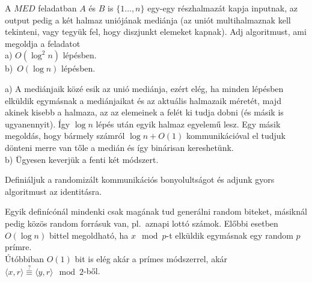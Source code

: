 \begin{Exercise}[counter={sorszam}, difficulty=0]
	A $MED$ feladatban $A$ \'es $B$ is $\{1\ldots,n\}$ egy-egy r\'eszhalmaz\'at kapja inputnak, az output pedig a k\'et halmaz uni\'oj\'anak medi\'anja (az uni\'ot multihalmaznak kell tekinteni, vagy tegy\"uk fel, hogy diszjunkt elemeket kapnak). Adj algoritmust, ami megoldja a feladatot\\
	a) $O(\log^2 n)$ l\'ep\'esben.\\
	b)~\hard $O(\log n)$ l\'ep\'esben.
\end{Exercise}
\begin{Answer}
	a) A medi\'anjaik k\"oz\'e esik az uni\'o medi\'anja, ez\'ert el\'eg, ha minden l\'ep\'esben elk\"uldik egym\'asnak a medi\'anjaikat \'es az aktu\'alis halmazaik m\'eret\'et, majd akinek kisebb a halmaza, az az elemeinek a fel\'et ki tudja dobni (\'es m\'asik is ugyanennyit). \'Igy $\log n$ l\'ep\'es ut\'an egyik halmaz egyelem\H u lesz. Egy m\'asik megold\'as, hogy b\'armely sz\'amr\'ol $\log n+O(1)$ kommunik\'aci\'oval el tudjuk d\"onteni merre van t\H ole a medi\'an \'es \'igy bin\'arisan kereshet\"unk.\\
	b) \"Ugyesen keverj\"uk a fenti k\'et m\'odszert.
\end{Answer}

\begin{Exercise}[counter={sorszam}, difficulty=0]
	Defini\'aljuk a randomiz\'alt kommunik\'aci\'os bonyolults\'agot \'es adjunk gyors algoritmust az identit\'asra.
\end{Exercise}
\begin{Answer}
	Egyik defin\'ic\'on\'al mindenki csak mag\'anak tud gener\'alni random biteket, m\'asikn\'al pedig k\"oz\"os random forr\'asuk van, pl.\ aznapi lott\'o sz\'amok.
	El\H obbi esetben $O(\log n)$ bittel megoldhat\'o, ha $x \mod p$-t elk\"uldik egym\'asnak egy random $p$ pr\'imre.\\
	\'Ut\'obbiban $O(1)$ bit is el\'eg ak\'ar a pr\'imes m\'odszerrel, ak\'ar $\langle x,r\rangle\stackrel ?\equiv \langle y,r\rangle \mod 2$-b\H ol.
\end{Answer}


